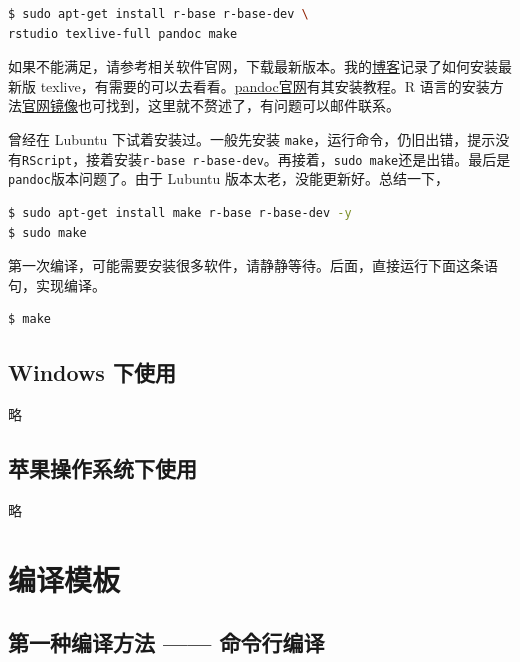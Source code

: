 \documentclass[doctor,openright,twoside]{sjtuthesis}
\newcommand{\passthrough}[1]{#1}
\theoremstyle{plain}
\theoremstyle{definition}
\theoremstyle{remark}
\theoremstyle{ocrenumbox}
\theoremstyle{plain}
\begin{document}
\begin{lstlisting}[language=bash, numbers=none]
$ sudo apt-get install r-base r-base-dev \
rstudio texlive-full pandoc make
\end{lstlisting}

如果不能满足，请参考相关软件官网，下载最新版本。我的\href{https://my.oschina.net/bubifengyun/blog/1936119}{博客}记录了如何安装最新版
texlive，有需要的可以去看看。\href{https://github.com/jgm/pandoc/blob/master/INSTALL.md}{pandoc官网}有其安装教程。R
语言的安装方法\href{https://mirrors.tuna.tsinghua.edu.cn/CRAN/}{官网镜像}也可找到，这里就不赘述了，有问题可以邮件联系。

曾经在 Lubuntu 下试着安装过。一般先安装
\passthrough{\lstinline!make!}，运行命令，仍旧出错，提示没有\passthrough{\lstinline!RScript!}，接着安装\passthrough{\lstinline!r-base r-base-dev!}。再接着，\passthrough{\lstinline!sudo make!}还是出错。最后是\passthrough{\lstinline!pandoc!}版本问题了。由于
Lubuntu 版本太老，没能更新好。总结一下，

\begin{lstlisting}[language=bash, numbers=none]
$ sudo apt-get install make r-base r-base-dev -y
$ sudo make
\end{lstlisting}

第一次编译，可能需要安装很多软件，请静静等待。后面，直接运行下面这条语句，实现编译。

\begin{lstlisting}[language=bash, numbers=none]
$ make
\end{lstlisting}

\hypertarget{windows-}{%
\subsection{Windows 下使用}\label{windows-}}

略

\subsection{苹果操作系统下使用}

略

\section{编译模板}

\hypertarget{-}{%
\subsection{第一种编译方法 ------ 命令行编译}\label{-}}
\end{document}
